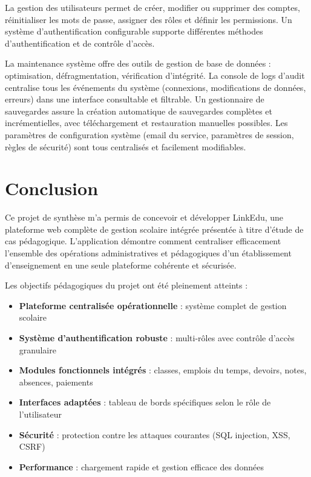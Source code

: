 \documentclass[12pt,a4paper]{report}
\begin{document}
    La gestion des utilisateurs permet de créer, modifier ou supprimer des comptes, réinitialiser les mots de passe, assigner des rôles et définir les permissions. Un système d'authentification configurable supporte différentes méthodes d'authentification et de contrôle d'accès.
    
    La maintenance système offre des outils de gestion de base de données : optimisation, défragmentation, vérification d'intégrité. La console de logs d'audit centralise tous les événements du système (connexions, modifications de données, erreurs) dans une interface consultable et filtrable. Un gestionnaire de sauvegardes assure la création automatique de sauvegardes complètes et incrémentielles, avec téléchargement et restauration manuelles possibles. Les paramètres de configuration système (email du service, paramètres de session, règles de sécurité) sont tous centralisés et facilement modifiables.





    \chapter*{Conclusion}
    \thispagestyle{plain}

    Ce projet de synthèse m'a permis de concevoir et développer LinkEdu, une plateforme web complète de gestion scolaire intégrée présentée à titre d'étude de cas pédagogique. L'application démontre comment centraliser efficacement l'ensemble des opérations administratives et pédagogiques d'un établissement d'enseignement en une seule plateforme cohérente et sécurisée.

    Les objectifs pédagogiques du projet ont été pleinement atteints :

    \begin{itemize}
        \item \textbf{Plateforme centralisée opérationnelle} : système complet de gestion scolaire
        \item \textbf{Système d'authentification robuste} : multi-rôles avec contrôle d'accès granulaire
        \item \textbf{Modules fonctionnels intégrés} : classes, emplois du temps, devoirs, notes, absences, paiements
        \item \textbf{Interfaces adaptées} : tableau de bords spécifiques selon le rôle de l'utilisateur
        \item \textbf{Sécurité} : protection contre les attaques courantes (SQL injection, XSS, CSRF)
        \item \textbf{Performance} : chargement rapide et gestion efficace des données
    \end{itemize}
\end{document}
